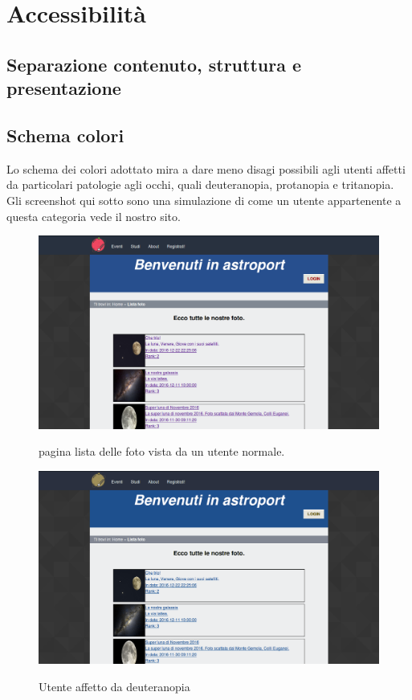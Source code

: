 	\section{Accessibilità}
	\subsection{Separazione contenuto, struttura e presentazione}
	\subsection{Schema colori}
	Lo schema dei colori adottato mira a dare meno disagi possibili agli utenti affetti da particolari patologie agli occhi, quali deuteranopia, protanopia e tritanopia. Gli screenshot qui sotto sono una simulazione di come un utente appartenente a questa categoria vede il nostro sito.\\
	\begin{figure}
		\includegraphics[scale=0.3]{images/test.png}\\[1cm] \caption{pagina lista delle foto vista da un utente normale.}
	\end{figure}
	\begin{figure}
		\includegraphics[scale=0.3]{images/deuteranopia.jpg}\\[1cm] \caption{Utente affetto da deuteranopia}
	\end{figure}
